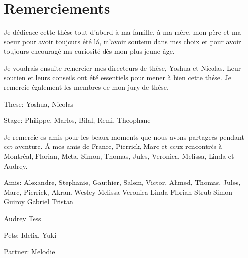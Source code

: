 \chapter*{Remerciements}

Je d\'{e}dicace cette th\`{e}se tout d'abord \`{a} ma famille, \`{a} ma m\`{e}re,
mon p\`{e}re et ma soeur pour avoir toujours \'{e}t\'{e} l\'{a}, m'avoir soutenu
dans mes choix et pour avoir
toujours encourag\'{e} ma curiosit\'{e} d\`{e}s mon plus jeune \^{a}ge.

Je voudrais ensuite remercier mes directeurs de th\`{e}se, Yoshua et Nicolas.
Leur soutien et leurs conseils ont \'{e}t\'{e} essentiels pour mener \`{a} bien
cette th\'{e}se. 
Je remercie \'{e}galement les membres de mon jury de th\`{e}se,

These: Yoshua, Nicolas

Stage: Philippe, Marlos, Bilal, Remi, Theophane

Je remercie es amis pour les beaux moments que nous
avons partage\'{e}s pendant cet aventure. \'{A} mes amis de France, Pierrick,
Marc et ceux rencontr\'{e}s \`{a} Montr\'{e}al, Florian, Meta, Simon, Thomas,
Jules, Veronica, Melissa, Linda et Audrey.

Amis: Alexandre, Stephanie, Gauthier, 
Salem, Victor, Ahmed, Thomas, Jules, Marc, Pierrick,
Akram
Wesley
Melissa
Veronica
Linda
Florian Strub
Simon Guiroy
Gabriel
Tristan

Audrey
Tess

Pets: Idefix, Yuki

Partner: Melodie

